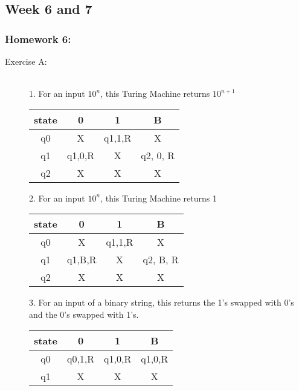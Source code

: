 \documentclass{article}
\theoremstyle{theorem}
\theoremstyle{definition}
\theoremstyle{remark}
\begin{document}
\subsection{Week 6 and 7}
\subsubsection{Homework 6:}
\begin{description}
\item[Exercise A:] \textbf{ }\\

1. For an input $10^n$, this Turing Machine returns $10^{n+1}$
  \begin{center}
    \begin{tabular}{||c c c c||} 
     \hline
      state & 0 & 1 & B \\ [0.5ex] 
     \hline\hline
     q0 & X & q1,1,R & X\\
     \hline
     q1 & q1,0,R & X & q2, 0, R \\
     \hline
     q2 & X & X & X \\[1ex] 
     \hline
    \end{tabular}
    \end{center}

2. For an input $10^n$, this Turing Machine returns 1
  \begin{center}
    \begin{tabular}{||c c c c||} 
     \hline
      state & 0 & 1 & B \\ [0.5ex] 
     \hline\hline
     q0 & X & q1,1,R & X\\
     \hline
     q1 & q1,B,R & X & q2, B, R \\
     \hline
     q2 & X & X & X \\[1ex] 
     \hline
    \end{tabular}
    \end{center}

3. For an input of a binary string, this returns the 1's swapped with 0's and the 0's swapped with 1's.
  \begin{center}
    \begin{tabular}{||c c c c||} 
     \hline
      state & 0 & 1 & B \\ [0.5ex] 
     \hline\hline
     q0 & q0,1,R & q1,0,R & q1,0,R\\
     \hline
     q1 & X & X & X \\[1ex] 
     \hline
    \end{tabular}
    \end{center}


\end{description}
\end{document}
